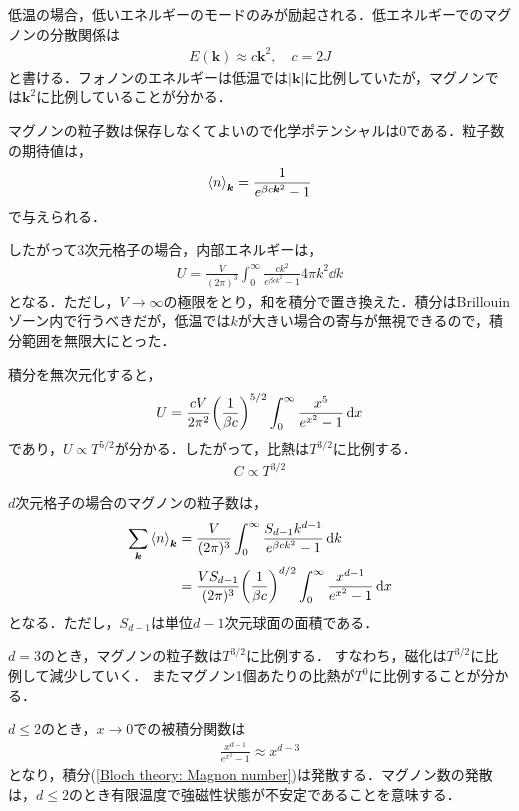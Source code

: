 \documentclass[dvipdfmx,9pt]{beamer}
\numberwithin{equation}{section}
\begin{document}
\begin{frame}
    低温の場合，低いエネルギーのモードのみが励起される．低エネルギーでのマグノンの分散関係は
    \begin{align}
        E(\bm{k}) \approx c\bm{k}^2, \quad c = 2J
    \end{align}
    と書ける．フォノンのエネルギーは低温では$|\bm{k}|$に比例していたが，マグノンでは$\bm{k}^2$に比例していることが分かる．

    マグノンの粒子数は保存しなくてよいので化学ポテンシャルは$0$である．粒子数の期待値は，
    \begin{align}
        \expval{n}_{\bm{k}} = \frac{1}{e^{\beta c \bm{k}^2}-1}
    \end{align}
    で与えられる．
\end{frame}

\begin{frame}{}
    したがって3次元格子の場合，内部エネルギーは，
    \begin{align}
        U = \frac{V}{(2\pi)^3}\int_0^\infty \frac{ck^2}{e^{\beta c k^2}-1} 4\pi k^2 \dd{k}
    \end{align}
    となる．ただし，$V \to \infty$の極限をとり，和を積分で置き換えた．積分はBrillouinゾーン内で行うべきだが，低温では$k$が大きい場合の寄与が無視できるので，積分範囲を無限大にとった．

    積分を無次元化すると，
    \begin{align}
        U = \frac{cV}{2\pi^2} \qty(\frac{1}{\beta c})^{5/2} \int_0^\infty \frac{x^5}{e^{x^2} - 1} \dd{x}
    \end{align}
    であり，$U \propto T^{5/2}$が分かる．したがって，比熱は$T^{3/2}$に比例する．
    \begin{align}
        C \propto T^{3/2}
    \end{align}
\end{frame}

\begin{frame}
    $d$次元格子の場合のマグノンの粒子数は，
    \begin{align}
        \sum_{\bm{k}} \expval{n}_{\bm{k}}
        &\nonumber
        = \frac{V}{(2\pi)^3} \int_0^\infty \frac{S_{d-1}k^{d-1}}{e^{\beta c k^2}-1} \dd{k}
        \\ &
        = \frac{VS_{d-1}}{(2\pi)^3} \qty(\frac{1}{\beta c})^{d/2}\int_0^\infty \frac{x^{d-1}}{e^{x^2}-1}\dd{x}
        \label{Bloch theory: Magnon number}
    \end{align}
    となる．ただし，$S_{d-1}$は単位$d-1$次元球面の面積である．
    
    $d=3$のとき，マグノンの粒子数は$T^{3/2}$に比例する．
    すなわち，磁化は$T^{3/2}$に比例して減少していく．
    またマグノン1個あたりの比熱が$T^0$に比例することが分かる．

    $d \le 2$のとき，$x \to 0$での被積分関数は
    \begin{align}
        \frac{x^{d-1}}{e^{x^2}-1} \approx x^{d-3}
    \end{align}
    となり，積分(\ref{Bloch theory: Magnon number})は発散する．マグノン数の発散は，$d \le 2$のとき有限温度で強磁性状態が不安定であることを意味する．
\end{frame}
\end{document}
